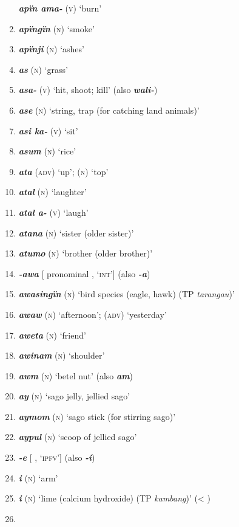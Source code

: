 \begin{enumerate}[noitemsep, label={}, align=left, widest=190, labelsep=1ex,leftmargin=*,itemindent=-10pt]
\textbf{\textit{apïn ama-}} (\textsc{v)} ‘burn’ \item
\textbf{\textit{apïngïn}} (\textsc{n)} ‘smoke’ \item
\textbf{\textit{apïnji}} (\textsc{n)} ‘ashes’ \item
\textbf{\textit{as}} (\textsc{n)} ‘grass’ \item
\textbf{\textit{asa-}} (\textsc{v)} ‘hit, shoot; kill’ (also \textbf{\textit{wali-}}) \item
\textbf{\textit{ase}} (\textsc{n)} ‘string, trap (for catching land animals)’ \item
\textbf{\textit{asi ka-}} (\textsc{v)} ‘sit’ \item
\textbf{\textit{asum}} (\textsc{n)} ‘rice’ \item
\textbf{\textit{ata}} (\textsc{adv)} ‘up’; (\textsc{n)} ‘top’ \item
\textbf{\textit{atal}} (\textsc{n)} ‘laughter’ \item
\textbf{\textit{atal a-}} (\textsc{v)} ‘laugh’ \item
\textbf{\textit{atana}} (\textsc{n)} ‘sister (older sister)’ \item
\textbf{\textit{atumo}} (\textsc{n)} ‘brother (older brother)’ \item
\textbf{\textit{-awa}} [ pronominal , ‘\textsc{int}’] (also \textbf{\textit{-a}}) \item
\textbf{\textit{awasingïn}} (\textsc{n)} ‘bird species (eagle, hawk) (TP \textit{tarangau})’ \item
\textbf{\textit{awaw}} (\textsc{n)} ‘afternoon’; (\textsc{adv)} ‘yesterday’ \item
\textbf{\textit{aweta}} (\textsc{n)} ‘friend’ \item
\textbf{\textit{awinam}} (\textsc{n)} ‘shoulder’ \item
\textbf{\textit{awm}} (\textsc{n)} ‘betel nut’ (also \textbf{\textit{am}}) \item
\textbf{\textit{ay}} (\textsc{n)} ‘sago jelly, jellied sago’ \item
\textbf{\textit{aymom}} (\textsc{n)} ‘sago stick (for stirring sago)’ \item
\textbf{\textit{aypul}} (\textsc{n)} ‘scoop of jellied sago’ \item
\textbf{\textit{-e}} [ , ‘\textsc{ipfv}’] (also \textbf{\textit{-i}}) \item
\textbf{\textit{i}} (\textsc{n)} ‘arm’ \item
\textbf{\textit{i}} (\textsc{n)} ‘lime (calcium hydroxide) (TP \textit{kambang})’ (< ) \item

\end{enumerate}
